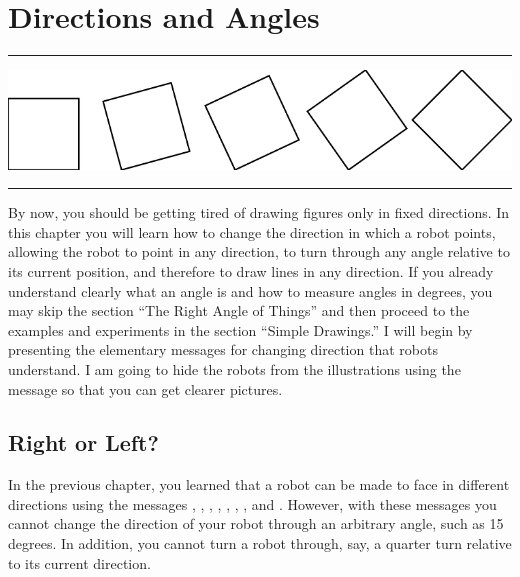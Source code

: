 \documentclass[a4paper,10pt,twoside]{book}
\begin{document}
    \sloppy
\fi
\chapter{Directions and Angles}\label{cha:turning}

\noindent\hrule
\hfil \includegraphics[width=0.9\linewidth]{ChTurntitlePicture}\hfil
\vspace{0.2cm}
\noindent\hrule\vspace{1.5cm}


By now, you should be getting tired of drawing figures only in fixed directions. In this chapter 
you will learn how to change the direction in which a robot points, allowing the robot to point 
in any direction, to turn through any angle relative to its current position, and therefore to draw 
lines in any direction. If you already understand clearly what an angle is and how to measure 
angles in degrees, you may skip the section “The Right Angle of Things” and then proceed to 
the examples and experiments in the section “Simple Drawings.” 
I will begin by presenting the elementary messages for changing direction that robots 
understand. I am going to hide the robots from the illustrations using the message  
so that you can get clearer pictures. 

\newpage

\section{Right or Left?}

In the previous chapter, you learned that a robot can be made to face in different directions 
using the messages , , , , ,
, , and . 
However, with these messages you cannot change the direction of your robot through an arbitrary angle, 
such as 15 degrees. In addition, you cannot turn a robot through, say, a quarter 
turn relative to its current direction. 
\end{document}
